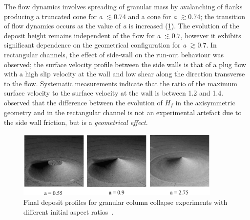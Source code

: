 The flow dynamics involves spreading of granular mass 
by avalanching of flanks producing a truncated cone for \textit{a} $\lesssim 
0.74$ and a cone for \textit{a} $\gtrsim 0.74$; the transition of flow dynamics 
occurs as the value of \textit{a} is increased (\cref{fig:cone}). The evolution 
of the deposit height remains independent of the flow for \textit{a} $\lesssim 
0.7$, however it exhibits significant dependence on the geometrical 
configuration for \textit{a} $\gtrsim 0.7$. In rectangular channels, the effect 
of side-wall on the run-out behaviour was observed; the surface velocity 
profile between the side walls is that of a plug flow with a high slip velocity 
at the wall and low shear along the direction transverse to the flow. 
Systematic measurements indicate that the ratio of the maximum surface velocity 
to the surface velocity at the wall is between 1.2 and 
1.4.~\citet{Lajeunesse2005} observed that the 
difference between the evolution of $\textit{H}_{\textit{f}}$ in the 
axisymmetric geometry and in the rectangular channel is not an experimental 
artefact due to the side wall friction, but is a \textit{geometrical effect}. 

\begin{figure}
\centering
\includegraphics[width=0.9\textwidth]{cone}
\caption{Final deposit profiles for granular column collapse experiments with 
different initial aspect ratios~\citep{Lube2005}.}
\label{fig:cone}
\end{figure}


